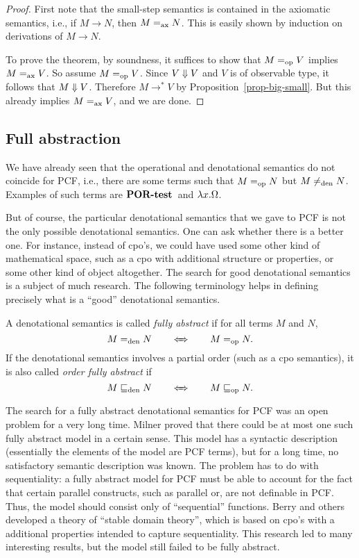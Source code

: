 \documentclass{article}
\begin{document}
\begin{proof}
  First note that the small-step semantics is contained in the
  axiomatic semantics, i.e., if $M\to N$, then $M=_{\rm ax} N$. This is
  easily shown by induction on derivations of $M\to N$. 
  
  To prove the theorem, by soundness, it suffices to show that $M=_{\rm op}
  V$ implies $M=_{\rm ax} V$. So assume $M=_{\rm op} V$. Since $V\Downarrow V$ and
  $V$ is of observable type, it follows that $M\Downarrow V$. Therefore
  $M\to^* V$ by Proposition~\ref{prop-big-small}. But this already
  implies $M=_{\rm ax} V$, and we are done.\eot
\end{proof}

\subsection{Full abstraction}

We have already seen that the operational and denotational semantics
do not coincide for PCF, i.e., there are some terms such that $M=_{\rm op}
N$ but $M\not=_{\rm den} N$. Examples of such terms are $\mathop{\textbf{\bf POR-test}\,}$ and
$\lambda x.\Omega$. 

But of course, the particular denotational semantics that we gave to
PCF is not the only possible denotational semantics. One can ask
whether there is a better one. For instance, instead of cpo's, we
could have used some other kind of mathematical space, such as a cpo
with additional structure or properties, or some other kind of object
altogether. The search for good denotational semantics is a subject of
much research. The following terminology helps in defining precisely
what is a ``good'' denotational semantics.

\begin{definition}
  A denotational semantics is called {\em fully abstract} if for all
  terms $M$ and $N$,
  \[        M=_{\rm den} N  \hspace{2em}\Leftarrow\!\!\!\Rightarrow\hspace{2em}   M=_{\rm op} N.
  \]
  If the denotational semantics involves a partial order (such as a
  cpo semantics), it is also called {\em order fully abstract} if
  \[        M\sqsubseteq_{\rm den} N   \hspace{2em}\Leftarrow\!\!\!\Rightarrow\hspace{2em}    M\sqsubseteq_{\rm op} N.
  \]
\end{definition}

\vspace{-.1ex}

The search for a fully abstract denotational semantics for PCF was an
open problem for a very long time. Milner proved that there could be
at most one such fully abstract model in a certain sense. This model
has a syntactic description (essentially the elements of the model are
PCF terms), but for a long time, no satisfactory semantic description
was known. The problem has to do with sequentiality: a fully abstract
model for PCF must be able to account for the fact that certain
parallel constructs, such as parallel or, are not definable in PCF.
Thus, the model should consist only of ``sequential'' functions. Berry
and others developed a theory of ``stable domain theory'', which is
based on cpo's with a additional properties intended to capture
sequentiality. This research led to many interesting results, but the
model still failed to be fully abstract. 
\end{document}
